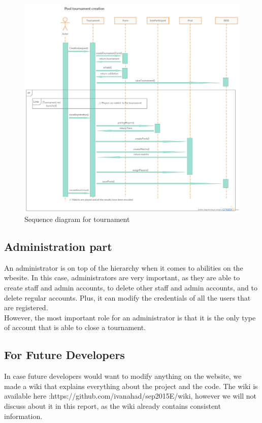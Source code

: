 \documentclass[a4paper, 12pt]{article}
\begin{document}
\begin{figure}[h]
   \caption{\label{tournseq} Sequence diagram for tournament}
  \includegraphics[scale=0.4]{Tournament.png}
\end{figure}
\FloatBarrier
\newpage


\subsection*{Administration part}

An administrator is on top of the hierarchy when it comes to abilities on the wbesite. In this case, administrators are very important, as they are able to create staff and admin accounts, to delete other staff and admin accounts, and to delete regular accounts. Plus, it can modify the credentials of all the users that are registered.\\

However, the most important role for an administrator is that it is the only type of account that is able to close a tournament.

\subsection*{For Future Developers}

In case future developers would want to modify anything on the website, we made a wiki that explains everything about the project and the code. The wiki is available here :https://github.com/ivanahad/sep2015E/wiki, however we will not discuss about it in this report, as the wiki already contains consistent information.
\end{document}
